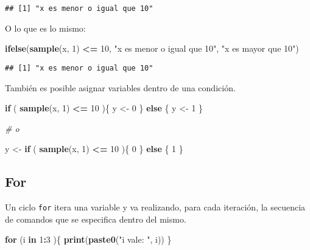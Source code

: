\documentclass[]{article}
\newenvironment{Shaded}{\begin{snugshade}}{\end{snugshade}}
\newcommand{\KeywordTok}[1]{\textcolor[rgb]{0.13,0.29,0.53}{\textbf{#1}}}
\newcommand{\DecValTok}[1]{\textcolor[rgb]{0.00,0.00,0.81}{#1}}
\newcommand{\StringTok}[1]{\textcolor[rgb]{0.31,0.60,0.02}{#1}}
\newcommand{\CommentTok}[1]{\textcolor[rgb]{0.56,0.35,0.01}{\textit{#1}}}
\newcommand{\ControlFlowTok}[1]{\textcolor[rgb]{0.13,0.29,0.53}{\textbf{#1}}}
\newcommand{\OperatorTok}[1]{\textcolor[rgb]{0.81,0.36,0.00}{\textbf{#1}}}
\newcommand{\NormalTok}[1]{#1}
\begin{document}
\begin{verbatim}
## [1] "x es menor o igual que 10"
\end{verbatim}

O lo que es lo mismo:

\begin{Shaded}
\begin{Highlighting}[]
\KeywordTok{ifelse}\NormalTok{(}\KeywordTok{sample}\NormalTok{(x, }\DecValTok{1}\NormalTok{) }\OperatorTok{<=}\StringTok{ }\DecValTok{10}\NormalTok{, }\StringTok{"x es menor o igual que 10"}\NormalTok{, }\StringTok{"x es mayor que 10"}\NormalTok{)}
\end{Highlighting}
\end{Shaded}

\begin{verbatim}
## [1] "x es menor o igual que 10"
\end{verbatim}

También es posible asignar variables dentro de una condición.

\begin{Shaded}
\begin{Highlighting}[]
\ControlFlowTok{if}\NormalTok{ ( }\KeywordTok{sample}\NormalTok{(x, }\DecValTok{1}\NormalTok{) }\OperatorTok{<=}\StringTok{ }\DecValTok{10}\NormalTok{ )\{}
\NormalTok{  y <-}\StringTok{ }\DecValTok{0}
\NormalTok{\} }\ControlFlowTok{else}\NormalTok{ \{}
\NormalTok{  y <-}\StringTok{ }\DecValTok{1}
\NormalTok{\}}

\CommentTok{# o}

\NormalTok{y <-}\StringTok{ }\ControlFlowTok{if}\NormalTok{ ( }\KeywordTok{sample}\NormalTok{(x, }\DecValTok{1}\NormalTok{) }\OperatorTok{<=}\StringTok{ }\DecValTok{10}\NormalTok{ )\{}
    \DecValTok{0}
\NormalTok{  \} }\ControlFlowTok{else}\NormalTok{ \{}
    \DecValTok{1}
\NormalTok{  \}}
\end{Highlighting}
\end{Shaded}

\subsection{For}\label{for}

Un ciclo \texttt{for} itera una variable y va realizando, para cada
iteración, la secuencia de comandos que se especifica dentro del mismo.

\begin{Shaded}
\begin{Highlighting}[]
\ControlFlowTok{for}\NormalTok{ (i }\ControlFlowTok{in} \DecValTok{1}\OperatorTok{:}\DecValTok{3}\NormalTok{ )\{}
  \KeywordTok{print}\NormalTok{(}\KeywordTok{paste0}\NormalTok{(}\StringTok{"i vale: "}\NormalTok{, i))}
\NormalTok{\}}
\end{Highlighting}
\end{Shaded}
\end{document}
